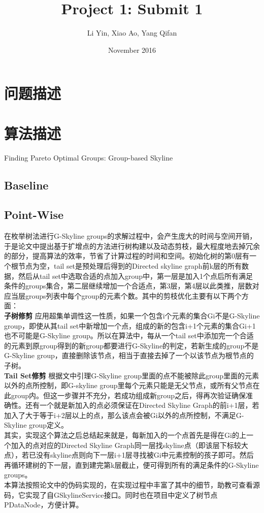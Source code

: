 \documentclass{article}
\title{Project 1: Submit 1}
\author{Li Yin, Xiao Ao, Yang Qifan}
\date{November 2016}
\begin{document}
\maketitle
\begin{CJK}{UTF8}{gbsn}  

\section{问题描述}

\section{算法描述}

Finding Pareto Optimal Groups: Group-based Skyline

\subsection{Baseline}


\subsection{Point-Wise}
在枚举树法进行G-Skyline groups的求解过程中，会产生庞大的时间与空间开销，于是论文中提出基于扩增点的方法进行树构建以及动态剪枝，最大程度地去掉冗余的部分，提高算法的效率，节省了计算过程的时间和空间。初始化树的第0层有一个根节点为空，tail set是预处理后得到的Directed skyline graph前k层的所有数据，然后从tail set中选取合适的点加入group中，第一层是加入1个点后所有满足条件的groups集合，第二层继续增加一个合适点，第3层，第4层以此类推，层数对应当层groups列表中每个group的元素个数。其中的剪枝优化主要有以下两个方面：\\
\textbf{子树修剪}
应用超集单调性这一性质，如果一个包含i个元素的集合Gi不是G-Skyline group，即使从其tail set中新增加一个点，组成的新的包含i+1个元素的集合Gi+1也不可能是G-Skyline group。所以在算法中，每从一个tail set中添加完一个合适的元素到原group得到的新group都要进行G-Skyline的判定，若新生成的group不是G-Skyline group，直接删除该节点，相当于直接去掉了一个以该节点为根节点的子树。\\
\textbf{Tail Set修剪}
根据文中引理G-Skyline group里面的点不能被除此group里面的元素以外的点所控制，即G-skyline group里每个元素只能是无父节点，或所有父节点在此group内。但这一步骤并不充分，若成功组成新group之后，得再次验证确保准确性。还有一个就是新加入的点必须保证在Directed Skyline Graph的前i+1层，若加入了大于等于i+2层以上的点，那么该点会被Gi以外的点所控制，不满足G-Skyline group定义。\\
其实，实现这个算法之后总结起来就是，每新加入的一个点首先是得在Gi的上一个加入的点对应的Directed Skyline Graph同一层找skyline点（即该层下标较大点），若已没有skyline点则向下一层i+1层寻找被Gi中元素控制的孩子即可。然后再循环建树的下一层，直到建完第k层截止，便可得到所有的满足条件的G-Skyline groups。\\
本算法按照论文中的伪码实现的，在实现过程中丰富了其中的细节，助教可查看源码，它实现了自GSkylineService接口。同时也在项目中定义了树节点PDataNode，方便计算。


\end{CJK}
\end{document}
